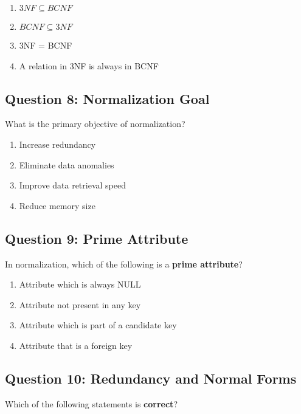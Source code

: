\begin{enumerate}[label=(\alph*)]
    \item $3NF \subseteq BCNF$
    \item $BCNF \subseteq 3NF$
    \item 3NF = BCNF
    \item A relation in 3NF is always in BCNF
\end{enumerate}

\vspace{1em}

\subsection*{Question 8: Normalization Goal}
What is the primary objective of normalization?

\begin{enumerate}[label=(\alph*)]
    \item Increase redundancy
    \item Eliminate data anomalies
    \item Improve data retrieval speed
    \item Reduce memory size
\end{enumerate}

\vspace{1em}

\subsection*{Question 9: Prime Attribute}
In normalization, which of the following is a \textbf{prime attribute}?

\begin{enumerate}[label=(\alph*)]
    \item Attribute which is always NULL
    \item Attribute not present in any key
    \item Attribute which is part of a candidate key
    \item Attribute that is a foreign key
\end{enumerate}

\vspace{1em}

\subsection*{Question 10: Redundancy and Normal Forms}
Which of the following statements is \textbf{correct}?

